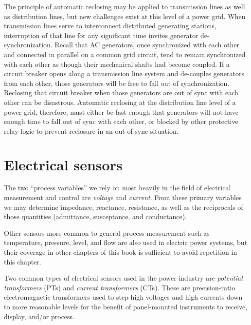\vskip 10pt

The principle of automatic reclosing may be applied to transmission lines as well as distribution lines, but new challenges exist at this level of a power grid.  When transmission lines serve to interconnect distributed generating stations, interruption of that line for any significant time invites generator de-synchronization.  Recall that AC generators, once synchronized with each other and connected in parallel on a common grid circuit, tend to remain synchronized with each other as though their mechanical shafts had become coupled.  If a circuit breaker opens along a transmission line system and de-couples generators from each other, those generators will be free to fall out of synchronization.  Reclosing that circuit breaker when those generators are out of sync with each other can be disastrous.  Automatic reclosing at the distribution line level of a power grid, therefore, must either be fast enough that generators will not have enough time to fall out of sync with each other, or blocked by other protective relay logic to prevent reclosure in an out-of-sync situation.










\filbreak
\section{Electrical sensors}

The two ``process variables'' we rely on most heavily in the field of electrical measurement and control are \textit{voltage} and \textit{current}.  From these primary variables we may determine impedance, reactance, resistance, as well as the reciprocals of those quantities (admittance, susceptance, and conductance).  

Other sensors more common to general process measurement such as temperature, pressure, level, and flow are also used in electric power systems, but their coverage in other chapters of this book is sufficient to avoid repetition in this chapter.

Two common types of electrical sensors used in the power industry are \textit{potential transformers} (PTs) and \textit{current transformers} (CTs).  These are precision-ratio electromagnetic transformers used to step high voltages and high currents down to more reasonable levels for the benefit of panel-mounted instruments to receive, display, and/or process.




